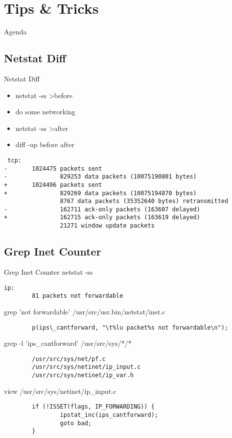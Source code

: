 \documentclass[14pt]{beamer}
\begin{document}
\section{Tips \& Tricks}
\begin{frame}{Agenda}
\tableofcontents[currentsection]
\end{frame}

\subsection{Netstat Diff}
\begin{frame}[fragile]{Netstat Diff}
\begin{itemize}
  \item netstat -ss >before
  \item do some networking
  \item netstat -ss >after
  \item diff -up before after
\end{itemize}
\scriptsize
\begin{verbatim}
 tcp:
-       1024475 packets sent
-               829253 data packets (10075190801 bytes)
+       1024496 packets sent
+               829269 data packets (10075194870 bytes)
                8767 data packets (35352640 bytes) retransmitted
-               162711 ack-only packets (163607 delayed)
+               162715 ack-only packets (163619 delayed)
                21271 window update packets
\end{verbatim}
\end{frame}

\subsection{Grep Inet Counter}
\begin{frame}[fragile]{Grep Inet Counter}
\scriptsize
netstat -ss
\begin{verbatim}
ip:
        81 packets not forwardable
\end{verbatim}
grep 'not forwardable' /usr/src/usr.bin/netstat/inet.c
\begin{verbatim}
        p(ips\_cantforward, "\t%lu packet%s not forwardable\n");
\end{verbatim}
grep -l 'ips\_cantforward' /usr/src/sys/*/*
\begin{verbatim}
        /usr/src/sys/net/pf.c
        /usr/src/sys/netinet/ip_input.c
        /usr/src/sys/netinet/ip_var.h
\end{verbatim}
view /usr/src/sys/netinet/ip\_input.c
\begin{verbatim}
        if (!ISSET(flags, IP_FORWARDING)) {
                ipstat_inc(ips_cantforward);
                goto bad;
        }
\end{verbatim}
\end{frame}
\end{document}
